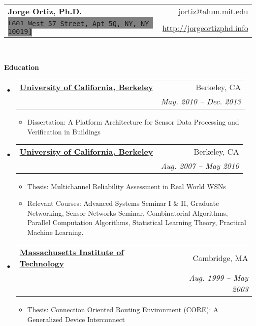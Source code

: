 \documentclass[letterpaper,11pt]{article}
\makeatletter
\newcommand{\resitem}[1]{\item #1 \vspace{-2pt}}
\newcommand{\resheading}[1]{{\large \colorbox{mygrey}{\begin{minipage}{\textwidth}{\textbf{#1 \vphantom{p\^{E}}}}\end{minipage}}}}
\newcommand{\ressubheading}[4]{
\begin{tabular*}{6.5in}{l@{\extracolsep{\fill}}r}
		\textbf{#1} & #2 \\
		\textit{#3} & \textit{#4} \\
\end{tabular*}\vspace{-6pt}}
\makeatother
\begin{document}
\newcommand{\mywebheader}{
\begin{tabular*}{7in}{l@{\extracolsep{\fill}}r}
	\textbf{\href{http://researcher.ibm.com/researcher/view.php?person=us-jjortiz}{\LARGE Jorge Ortiz, Ph.D.}} & \href{mailto:jortiz@alum.mit.edu}{jortiz@alum.mit.edu}\\
	{\footnotesize \texttt{\colorbox{gray}{[601 West 57 Street, Apt 5Q, NY, NY 10019]}}} & \href{http://researcher.ibm.com/researcher/view.php?person=us-jjortiz}{http://jorgeortizphd.info} \\
	\end{tabular*}
\\
\vspace{0.1in}}

\mywebheader

\resheading{Education}
	\begin{itemize}
        \item
            \ressubheading{\href{}{University of California, Berkeley}}{Berkeley, CA}{\href{}{Doctor of Philosophy in Computer Science}; \href{}}{May. 2010 -- Dec. 2013}
                { \footnotesize
				\begin{itemize}
					\resitem{Dissertation: A Platform Architecture for Sensor Data Processing and Verification in Buildings}
				\end{itemize}
				}
        \item
            \ressubheading{\href{}{University of California, Berkeley}}{Berkeley, CA}{\href{}{Masters of Science in Computer Science}; \href{}}{Aug. 2007 -- May 2010}
                { \footnotesize
				\begin{itemize}
					\resitem{Thesis: Multichannel Reliability Assessment in Real World WSNs}
                    \resitem{Relevant Courses: Advanced Systems Seminar I \& II, Graduate Networking, Sensor Networks Seminar, Combinatorial Algorithms, Parallel Computation Algorithms, Statistical Learning Theory, Practical Machine Learning.}
				\end{itemize}
				}
       \item
            \ressubheading{\href{}{Massachusetts Institute of Technology}}{Cambridge, MA}{\href{}{Bachelors of Science in Computer Science and Engineering}; \href{}}{Aug. 1999 -- May 2003}
                { \footnotesize
				\begin{itemize}
					\resitem{Thesis: Connection Oriented Routing Environment (CORE): A Generalized Device         Interconnect}
				\end{itemize}
				}
    \end{itemize} %
\end{document}

